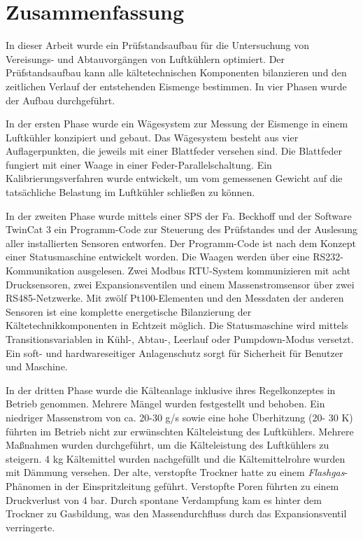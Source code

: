 \chapter{Zusammenfassung}
\label{cha:Zusammenfassung}


In dieser Arbeit wurde ein Prüfstandsaufbau für die Untersuchung von Vereisungs- und Abtauvorgängen von Luftkühlern optimiert. Der Prüfstandsaufbau kann alle kältetechnischen Komponenten bilanzieren und den zeitlichen Verlauf der entstehenden Eismenge bestimmen. In vier Phasen wurde der Aufbau durchgeführt. 

In der ersten Phase wurde ein Wägesystem zur Messung der Eismenge in einem Luftkühler konzipiert und gebaut. Das Wägesystem besteht aus vier Auflagerpunkten, die jeweils mit einer Blattfeder versehen sind. Die Blattfeder fungiert mit einer Waage in einer Feder-Parallelschaltung. Ein Kalibrierungsverfahren wurde entwickelt, um vom gemessenen Gewicht auf die tatsächliche Belastung im Luftkühler schließen zu können.

In der zweiten Phase wurde mittels einer SPS der Fa. Beckhoff und der Software TwinCat 3 ein Programm-Code zur Steuerung des Prüfstandes und der Auslesung aller installierten Sensoren entworfen. Der Programm-Code ist nach dem Konzept einer Statusmaschine entwickelt worden. Die Waagen werden über eine RS232-Kommunikation ausgelesen. Zwei Modbus RTU-System kommunizieren mit acht Drucksensoren, zwei Expansionsventilen und einem Massenstromsensor über zwei RS485-Netzwerke. Mit zwölf Pt100-Elementen und den Messdaten der anderen Sensoren ist eine komplette energetische Bilanzierung der Kältetechnikkomponenten in Echtzeit möglich. 
Die Statusmaschine wird mittels Transitionsvariablen in Kühl-, Abtau-, Leerlauf oder Pumpdown-Modus versetzt. Ein soft- und hardwareseitiger Anlagenschutz sorgt für Sicherheit für Benutzer und Maschine. 

In der dritten Phase wurde die Kälteanlage inklusive ihres Regelkonzeptes in Betrieb genommen. Mehrere Mängel wurden festgestellt und behoben. Ein niedriger Massenstrom von ca. 20-30 g/s sowie eine hohe Überhitzung (20- 30 K) führten im Betrieb nicht zur erwünschten Kälteleistung des Luftkühlers. Mehrere Maßnahmen wurden durchgeführt, um die Kälteleistung des Luftkühlers zu steigern. 4 kg Kältemittel wurden nachgefüllt und die Kältemittelrohre wurden mit Dämmung versehen.  Der alte, verstopfte Trockner hatte zu einem \textit{Flashgas}-Phänomen in der Einspritzleitung geführt. Verstopfte Poren führten zu einem Druckverlust von 4 bar. Durch spontane Verdampfung kam es hinter dem Trockner zu Gasbildung, was den Massendurchfluss durch das Expansionsventil verringerte. 


